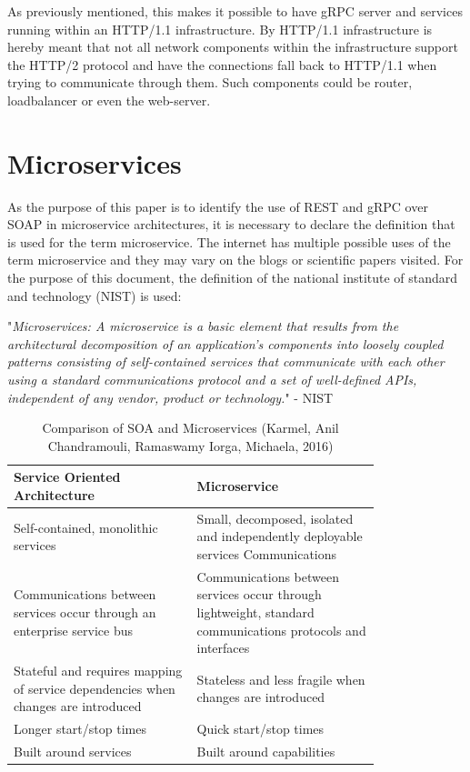 \documentclass[conference]{IEEEtran}
\begin{document}
As previously mentioned, this makes it possible to have gRPC server and services running within an HTTP/1.1 infrastructure. By HTTP/1.1 infrastructure is hereby meant that not all network components within the infrastructure support the HTTP/2 protocol and have the connections fall back to HTTP/1.1 when trying to communicate through them. Such components could be router, loadbalancer or even the web-server.

\section{Microservices}
\label{sec:micros}

As the purpose of this paper is to identify the use of REST and gRPC over SOAP in microservice architectures, it is necessary to declare the definition that is used for the term microservice. The internet has multiple possible uses of the term microservice and they may vary on the blogs or scientific papers visited. For the purpose of this document, the definition of the national institute of standard and technology (NIST) is used:

"\emph{Microservices: A microservice is a basic element that results from the architectural decomposition of an application’s components into loosely coupled patterns consisting of self-contained services that communicate with each other using a standard communications protocol and a set of well-defined APIs, independent of any vendor, product or technology.}" - NIST \cite{karmel2016nist}

\begin{table}[!htbp]
	\centering
	\caption{Comparison of SOA and Microservices (Karmel, Anil
		Chandramouli, Ramaswamy
		Iorga, Michaela, 2016)}
	\label{micro:comparison}
	\begin{tabular}{| p{0.4\linewidth} | p{0.4\linewidth}|}\hline
		Service Oriented Architecture & Microservice \\\hline
	Self-contained, monolithic services & Small, decomposed, isolated and independently deployable services Communications\\\hline
		Communications between services occur through an enterprise service bus & Communications between services occur through lightweight, standard communications protocols and interfaces\\\hline
		Stateful and requires mapping of service dependencies when changes are introduced & Stateless and less fragile when changes are introduced\\\hline
		Longer start/stop times & Quick start/stop times\\\hline
		Built around services & Built around capabilities\\\hline
	\end{tabular}
\end{table}
\end{document}
